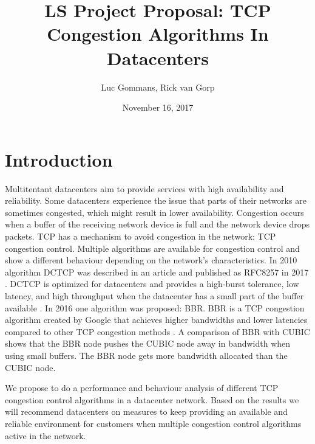 \documentclass{article}
\title{LS Project Proposal: TCP Congestion Algorithms In Datacenters}
\date{November 16, 2017}
\author{Luc Gommans, Rick van Gorp}
\begin{document}
\maketitle

\section{Introduction}
Multitentant datacenters aim to provide services with high availability and reliability. Some datacenters experience the issue that parts of their networks are sometimes congested, which might result in lower availability. Congestion occurs when a buffer of the receiving network device is full and the network device drops packets. TCP has a mechanism to avoid congestion in the network: TCP congestion control. Multiple algorithms are available for congestion control and show a different behaviour depending on the network's characteristics. In 2010 algorithm DCTCP was described in an article \cite{dctcp-congestion-original} and published as RFC8257 in 2017 \cite{dctcp-congestion}. DCTCP is optimized for datacenters and provides a high-burst tolerance, low latency, and high throughput when the datacenter has a small part of the buffer available \cite{dctcp-congestion}. In 2016 one algorithm was proposed: BBR. BBR is a TCP congestion algorithm created by Google that achieves higher bandwidths and lower latencies compared to other TCP congestion methods \cite{bbr-congestion}. A comparison of BBR with CUBIC \cite{bbr-congestion-comparison} shows that the BBR node pushes the CUBIC node away in bandwidth when using small buffers. The BBR node gets more bandwidth allocated than the CUBIC node.

We propose to do a performance and behaviour analysis of different TCP congestion control algorithms in a datacenter network. Based on the results we will recommend datacenters on measures to keep providing an available and reliable environment for customers when multiple congestion control algorithms active in the network.
\end{document}
